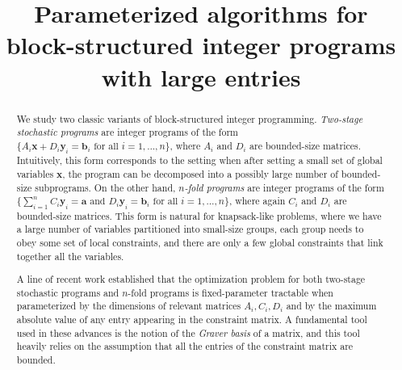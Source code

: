 \documentclass{theoretics}
\title{Parameterized algorithms for block-structured integer programs with large entries}
\newcommand{\tup}[1]{{\mathbf{#1}}}
\newcommand{\xx}{\tup x}
\newcommand{\yy}{\tup y}
\newcommand{\av}{\tup a}
\newcommand{\bb}{\tup b}
\begin{document}
\maketitle


\begin{abstract}
We study two classic variants of block-structured integer programming. {\em{Two-stage stochastic programs}} are integer programs of the form $\{A_i \xx + D_i \yy_i = \bb_i\textrm{ for all }i=1,\ldots,n\}$, where $A_i$ and $D_i$ are bounded-size matrices. Intuitively, this form corresponds to the setting when after setting a small set of global variables $\xx$, the program can be decomposed into a possibly large number of bounded-size subprograms.
On the other hand, {\em{$n$-fold programs}} are integer programs of the form $\{{\sum_{i=1}^n C_i\yy_i=\av} \textrm{ and } D_i\yy_i=\bb_i\textrm{ for all }i=1,\ldots,n\}$, where again $C_i$ and $D_i$ are bounded-size matrices. This form is natural for knapsack-like problems, where we have a large number of variables partitioned into small-size groups, each group needs to obey some set of local constraints, and there are only a few global constraints that link together all the variables.

A line of recent work established that the optimization problem for both two-stage stochastic programs and $n$-fold programs is fixed-parameter tractable when parameterized by the dimensions of relevant matrices $A_i,C_i,D_i$ and by the maximum absolute value of any entry appearing in the constraint matrix. A fundamental tool used in these advances is the notion of the {\em{Graver basis}} of a matrix, and this tool heavily relies on the assumption that all the entries of the constraint matrix are bounded.


\end{abstract}
\end{document}
